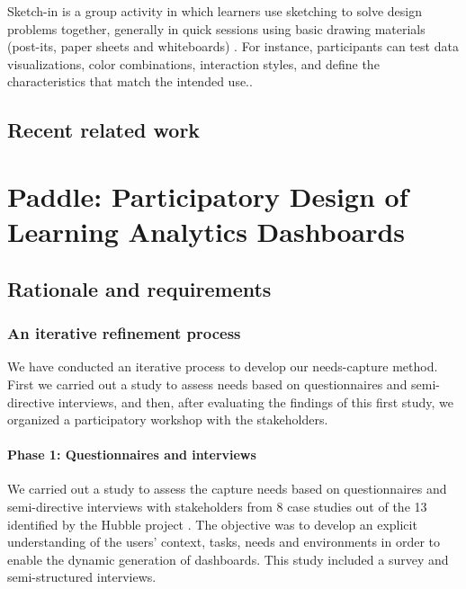 \documentclass[preprint,12pt]{elsarticle}
\begin{document}
Sketch-in is a group activity in which learners use sketching to solve design problems together, generally in quick sessions using basic drawing materials (post-its, paper sheets and whiteboards) \cite{prieto2018co}. For instance, participants can test data visualizations, color combinations, interaction styles, and define the characteristics that match the intended use..



\subsection{Recent related work}


\section{Paddle: Participatory Design of Learning Analytics Dashboards}
\subsection{Rationale and requirements}
\subsubsection{An iterative refinement process}
\label{sec:dimensions}
We have conducted an iterative process to develop our needs-capture method. First we carried out a study to assess needs based on questionnaires and semi-directive interviews, and then, after evaluating  the findings of this first study, we organized a participatory workshop with the stakeholders.


\paragraph{Phase 1: Questionnaires and interviews}
We carried out a study to assess the capture needs based on questionnaires and semi-directive interviews with stakeholders from 8 case studies out of the 13 identified by the Hubble project \cite{dabbebi2017towards}. 
The objective was to develop an explicit understanding of the users' context, tasks, needs and environments in order to enable the dynamic generation of dashboards. This study included a survey and semi-structured interviews.
\end{document}
